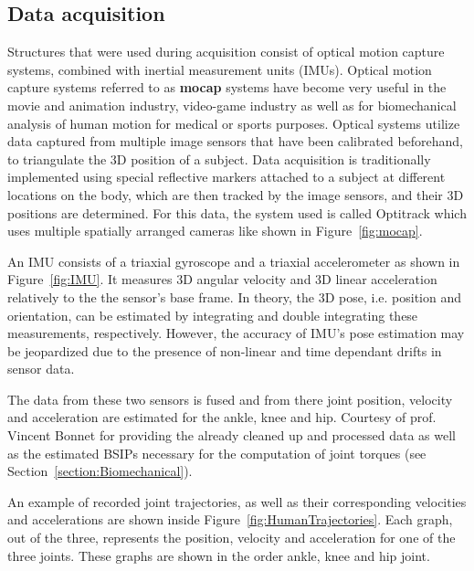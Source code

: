 \documentclass[12pt, a4paper]{article}
\begin{document}
\subsection{Data acquisition} \label{humandata}
Structures that were used during acquisition consist of optical motion capture systems, combined with inertial measurement units (IMUs). Optical motion capture systems referred to as \textbf{mocap} systems have become very useful in the movie and animation industry, video-game industry as well as for biomechanical analysis of human motion for medical or sports purposes. Optical systems utilize data captured from multiple image sensors that have been calibrated beforehand, to triangulate the 3D position of a subject. Data acquisition is traditionally implemented using special reflective markers attached to a subject at different locations on the body, which are then tracked by the image sensors, and their 3D positions are determined. For this data, the system used is called Optitrack which uses multiple spatially arranged cameras like shown in Figure~\ref{fig:mocap}.\par
An IMU consists of a triaxial gyroscope and a triaxial accelerometer as shown in Figure~\ref{fig:IMU}. It measures 3D angular velocity and 3D linear acceleration relatively to the the sensor’s base frame. In theory, the 3D pose, i.e. position and orientation, can be estimated by integrating and double integrating these measurements, respectively. However, the accuracy of IMU’s pose estimation may be jeopardized due to the presence of non-linear and time dependant drifts in sensor data.\par
The data from these two sensors is fused and from there joint position, velocity and acceleration are estimated for the ankle, knee and hip. Courtesy of prof. Vincent Bonnet for providing the already cleaned up and processed data as well as the estimated BSIPs necessary for the computation of joint torques (see Section~\ref{section:Biomechanical}).\par
An example of recorded joint trajectories, as well as their corresponding velocities and accelerations are shown inside Figure~\ref{fig:HumanTrajectories}. Each graph, out of the three, represents the position, velocity and acceleration for one of the three joints. These graphs are shown in the order ankle, knee and hip joint.\par
\end{document}
